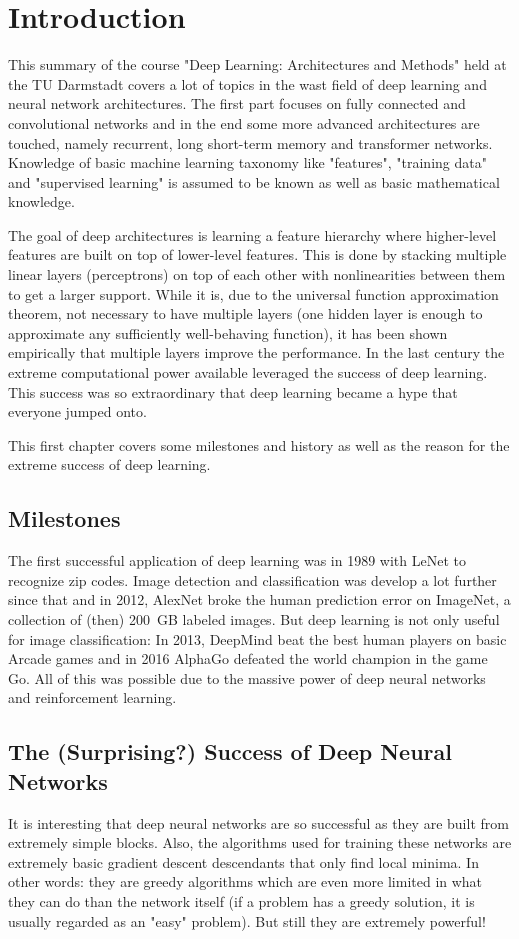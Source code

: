 

\chapter{Introduction}
	This summary of the course "Deep Learning: Architectures and Methods" held at the TU Darmstadt covers a lot of topics in the wast field of deep learning and neural network architectures. The first part focuses on fully connected and convolutional networks and in the end some more advanced architectures are touched, namely recurrent, long short-term memory and transformer networks. Knowledge of basic machine learning taxonomy like "features", "training data" and "supervised learning" is assumed to be known as well as basic mathematical knowledge.

	The goal of deep architectures is learning a feature hierarchy where higher-level features are built on top of lower-level features. This is done by stacking multiple linear layers (perceptrons) on top of each other with nonlinearities between them to get a larger support. While it is, due to the universal function approximation theorem, not necessary to have multiple layers (one hidden layer is enough to approximate any sufficiently well-behaving function), it has been shown empirically that multiple layers improve the performance. In the last century the extreme computational power available leveraged the success of deep learning. This success was so extraordinary that deep learning became a hype that everyone jumped onto.

	This first chapter covers some milestones and history as well as the reason for the extreme success of deep learning.

	\section{Milestones}
		The first successful application of deep learning was in 1989 with LeNet to recognize zip codes. Image detection and classification was develop a lot further since that and in 2012, AlexNet broke the human prediction error on ImageNet, a collection of (then) \SI{200}{GB} labeled images. But deep learning is not only useful for image classification: In 2013, DeepMind beat the best human players on basic Arcade games and in 2016 AlphaGo defeated the world champion in the game Go. All of this was possible due to the massive power of deep neural networks and reinforcement learning.

	\section{The (Surprising?) Success of Deep Neural Networks}
		It is interesting that deep neural networks are so successful as they are built from extremely simple blocks. Also, the algorithms used for training these networks are extremely basic gradient descent descendants that only find local minima. In other words: they are greedy algorithms which are even more limited in what they can do than the network itself (if a problem has a greedy solution, it is usually regarded as an "easy" problem). But still they are extremely powerful!


